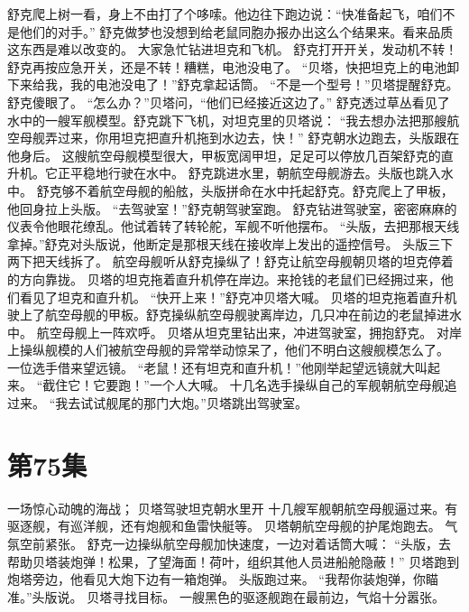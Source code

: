 \documentclass[a4paper,12pt,UTF8,twoside]{ctexbook}
\begin{document}
        舒克爬上树一看，身上不由打了个哆嗦。他边往下跑边说：“快准备起飞，咱们不是他们的对手。” 
        舒克做梦也没想到给老鼠同胞办报办出这么个结果来。看来品质这东西是难以改变的。 
        大家急忙钻进坦克和飞机。 
        舒克打开开关，发动机不转！舒克再按应急开关，还是不转！糟糕，电池没电了。 
        “贝塔，快把坦克上的电池卸下来给我，我的电池没电了！”舒克拿起话筒。 
        “不是一个型号！”贝塔提醒舒克。 
        舒克傻眼了。 
        “怎么办？”贝塔问，“他们已经接近这边了。” 
        舒克透过草丛看见了水中的一艘军舰模型。舒克跳下飞机，对坦克里的贝塔说： 
        “我去想办法把那艘航空母舰弄过来，你用坦克把直升机拖到水边去，快！” 
        舒克朝水边跑去，头版跟在他身后。 
        这艘航空母舰模型很大，甲板宽阔甲坦，足足可以停放几百架舒克的直升机。它正平稳地行驶在水中。 
        舒克跳进水里，朝航空母舰游去。头版也跳入水中。 
        舒克够不着航空母舰的船舷，头版拼命在水中托起舒克。舒克爬上了甲板，他回身拉上头版。 
        “去驾驶室！”舒克朝驾驶室跑。 
        舒克钻进驾驶室，密密麻麻的仪表令他眼花缭乱。他试着转了转轮舵，军舰不听他摆布。 
        “头版，去把那根天线拿掉。”舒克对头版说，他断定是那根天线在接收岸上发出的遥控信号。 
        头版三下两下把天线拆了。 
        航空母舰听从舒克操纵了！舒克让航空母舰朝贝塔的坦克停着的方向靠拢。 
        贝塔的坦克拖着直升机停在岸边。来抢钱的老鼠们已经拥过来，他们看见了坦克和直升机。 
        “快开上来！”舒克冲贝塔大喊。 
        贝塔的坦克拖着直升机驶上了航空母舰的甲板。舒克操纵航空母舰驶离岸边，几只冲在前边的老鼠掉进水中。 
        航空母舰上一阵欢呼。 
        贝塔从坦克里钻出来，冲进驾驶室，拥抱舒克。 
        对岸上操纵舰模的人们被航空母舰的异常举动惊呆了，他们不明白这艘舰模怎么了。 
        一位选手借来望远镜。 
        “老鼠！还有坦克和直升机！”他刚举起望远镜就大叫起来。 
        “截住它！它要跑！”一个人大喊。 
        十几名选手操纵自己的军舰朝航空母舰追过来。 
        “我去试试舰尾的那门大炮。”贝塔跳出驾驶室。   \chapter{第75集} 
        一场惊心动魄的海战； 
        贝塔驾驶坦克朝水里开   
        十几艘军舰朝航空母舰逼过来。有驱逐舰，有巡洋舰，还有炮舰和鱼雷快艇等。 
        贝塔朝航空母舰的护尾炮跑去。 
        气氛空前紧张。 
        舒克一边操纵航空母舰加快速度，一边对着话筒大喊： 
        “头版，去帮助贝塔装炮弹！松果，了望海面！荷叶，组织其他人员进船舱隐蔽！” 
        贝塔跑到炮塔旁边，他看见大炮下边有一箱炮弹。 
        头版跑过来。 
        “我帮你装炮弹，你瞄准。”头版说。 
        贝塔寻找目标。 
        一艘黑色的驱逐舰跑在最前边，气焰十分嚣张。 
\end{document}
